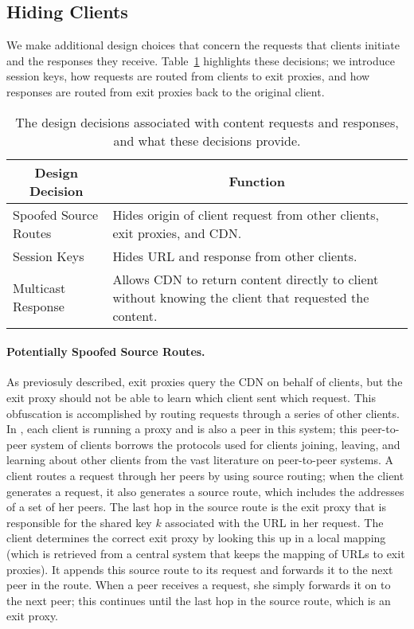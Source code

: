 \subsection{Hiding Clients}
\label{sec:hiding_clients}
We make additional design choices that concern the requests that clients initiate
and
the responses they receive.  Table~\ref{tab:request_response} highlights these decisions;
we 
introduce session keys, how requests are routed from clients to exit proxies, and how responses 
are routed from exit proxies back to the original client.

\begin{table}[t!]
\footnotesize
\centering
\begin{tabular}{ l  p{1.8in} } 
 \multicolumn{1}{c}{\bf Design Decision} & \multicolumn{1}{c}{\bf Function} \\
\hline \hline
Spoofed Source Routes & {Hides origin of client request from other
 clients, exit proxies, and CDN.} \\
 Session Keys & {Hides URL and response from other clients.} \\
 Multicast Response & {Allows CDN to return content directly to client without knowing
 the client that requested the content.} \\
 \hline
\end{tabular}
\caption{The design decisions associated with content requests and responses, and what these 
decisions provide.}
\label{tab:request_response}
\end{table}

\paragraph{Potentially Spoofed Source Routes.}
As previosuly described, exit proxies query the CDN on behalf of clients, but the
exit proxy
should not be able to learn which client sent which request.  This obfuscation is
accomplished by routing requests through
a series of other clients.  In \system{}, each client is running a proxy and is
also a peer in this system; this 
peer-to-peer system of clients borrows the 
protocols used for clients joining, leaving, and learning about other clients from
the vast literature on peer-to-peer systems. A client routes a request through
her peers by using source routing; when the client generates a request, it also
generates a source route, which includes
the addresses of a set of her peers.  The last hop in the source route is the exit proxy that is responsible for the 
shared key $k$ associated with the URL in her request.  The client determines the correct exit proxy by looking this 
up in a local mapping (which is retrieved from a central system that keeps the mapping of URLs to exit proxies).  
It appends this source route to its request and forwards it to the next peer
in the route.  When a peer receives
a request, she simply forwards it on to the next peer; this continues until the last hop in the source route, which 
is an exit proxy. 

